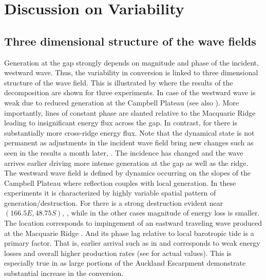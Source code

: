 \documentclass[12pt]{article}
\begin{document}
\section{Discussion on Variability}
\subsection{Three dimensional structure of the wave fields}
Generation at the gap strongly depends on magnitude and phase of the incident, westward wave. 
Thus, the variability in conversion is linked to three dimensional structure of the wave field. 
This is illustrated by  where the results of the decomposition are shown 
for three experiments. In case of  the westward wave is weak due to reduced generation at 
the Campbell Plateau (see also ). More importantly, lines of constant phase 
are slanted relative to the Macquarie Ridge leading to insignificant energy flux across the gap. In 
contrast, for  there is substantially more cross-ridge energy flux. Note that the 
dynamical state is not permanent as adjustments in the incident wave field bring new changes such 
as seen in the results a month later,  . The incidence 
has changed and the wave arrives earlier driving more intense generation at the gap as well as the 
ridge.\\

The westward wave field is defined by dynamics occurring on the slopes of the Campbell Plateau 
where reflection couples with local generation. In these experiments it is characterized by highly 
variable spatial pattern of generation/destruction. For  there is a strong destruction 
evident near $(166.5E, 48.75S)$, , while in the other cases 
magnitude 
of energy loss is smaller. The location corresponds to impingement of an eastward traveling wave 
produced at the Macquarie 
Ridge . And its phase lag relative to local barotropic tide 
is a primary factor. That is, earlier arrival such as in  and 
 corresponds to weak energy losses and overall higher production rates (see 
 for actual values). This is especially true in  as large 
portions of the Auckland Escarpment demonstrate substantial increase in the conversion.\\
\end{document}
